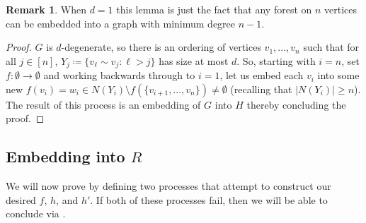 \documentclass{article}
\theoremstyle{definition}
\newtheorem{remark}[theorem]{Remark}
\begin{document}
\begin{remark}
    When $d=1$ this lemma is just the fact that any forest on $n$ vertices can be embedded into a graph with minimum degree $n-1$.
\end{remark}

\begin{proof}
$G$ is $d$-degenerate, so there is an ordering of vertices $v_1,...,v_n$ such that for all $j\in [n]$, $Y_j\coloneqq \{v_\ell \sim v_j:\ell>j\}$ has size at most $d$. So, starting with $i=n$, set $f:\emptyset \to \emptyset$ and working backwards through to $i=1$, let us embed each $v_i$ into some new $f(v_i)=w_i\in N(Y_i)\setminus f(\{v_{i+1},...,v_n\})\neq \emptyset$ (recalling that $|N(Y_i)|\geq n$). The result of this process is an embedding of $G$ into $H$ thereby concluding the proof. 
\end{proof}

\subsection{Embedding into $R$}\label{sec:intoR}

We will now prove  by defining two processes that attempt to construct our desired $f$, $h$, and $h'$. If both of these processes fail, then we will be able to conclude via . 
\end{document}
